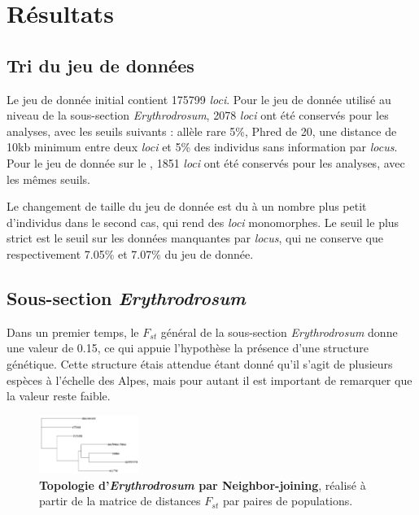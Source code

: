 \section{Résultats}

\subsection{Tri du jeu de données}

Le jeu de donnée initial contient 175799 \textit{loci}. Pour le jeu de donnée utilisé au niveau de la sous-section \textit{Erythrodrosum}, 2078 \textit{loci} ont été conservés pour les analyses, avec les seuils suivants : allèle rare 5\%, Phred de 20, une distance de 10kb minimum entre deux \textit{loci} et 5\% des individus sans information par \textit{locus}.
Pour le jeu de donnée sur le , 1851 \textit{loci} ont été conservés pour les analyses, avec les mêmes seuils.

Le changement de taille du jeu de donnée est du à un nombre plus petit d'individus dans le second cas, qui rend des \textit{loci} monomorphes. Le seuil le plus strict est le seuil sur les données manquantes par \textit{locus}, qui ne conserve que  respectivement 7.05\% et 7.07\% du jeu de donnée. 

\subsection{Sous-section \textit{Erythrodrosum}}

Dans un premier temps, le $F_{st}$ général de la sous-section \textit{Erythrodrosum} donne une valeur de 0.15, ce qui appuie l'hypothèse la présence d'une structure génétique. Cette structure étais attendue étant donné qu'il s'agit de plusieurs espèces à l'échelle des Alpes, mais pour autant il est important de remarquer que la valeur reste faible.

\begin{figure}
	\vspace{-20pt}
	\begin{center}
	\includegraphics[width=0.29\textwidth]{fig/topologie.png}
	\end{center}
	\caption{\textbf{Topologie d'\textit{Erythrodrosum} par Neighbor-joining}, réalisé à partir de la matrice de distances $F_{st}$ par paires de populations.}
    \label{topologie}
\end{figure}

